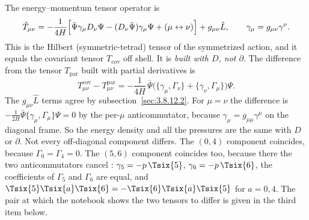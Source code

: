 The energy--momentum tensor operator is
\begin{equation}
  \hat T_{\mu\nu}=-\frac{1}{4H}\Bigl[\bar\Psi\gamma_\mu D_\nu\Psi-(D_\nu\bar\Psi)\gamma_\mu\Psi+(\mu\leftrightarrow\nu)\Bigr]+g_{\mu\nu}\hat L,
  \qquad \gamma_\mu=g_{\mu\nu}\gamma^\nu .
\end{equation}
This is the Hilbert (symmetric-tetrad) tensor of the symmetrized action, and it equals the
covariant tensor $T_{\text{cov}}$ off shell. It is \emph{built with $D$, not $\partial$}. The
difference from the tensor $T_{\text{par}}$ built with partial derivatives is \cfderived
\begin{equation}
  T^{\text{cov}}_{\mu\nu}-T^{\text{par}}_{\mu\nu}=-\frac{1}{4H}\,\bar\Psi\bigl(\{\gamma_\mu,\Gamma_\nu\}+\{\gamma_\nu,\Gamma_\mu\}\bigr)\Psi .
\end{equation}
The $g_{\mu\nu}\hat L$ terms agree by subsection~\ref{sec:3.8.12.2}. For $\mu=\nu$ the difference is
$-\frac{1}{2H}\bar\Psi\{\gamma_\mu,\Gamma_\mu\}\Psi=0$ by the per-$\mu$ anticommutator, because
$\gamma_\mu=g_{\mu\mu}\gamma^\mu$ on the diagonal frame. So the energy density and all the pressures
are the same with $D$ or $\partial$. Not every off-diagonal component differs. The $(0,4)$
component coincides, because $\Gamma_0=\Gamma_4=0$. The $(5,6)$ component coincides too, because
there the two anticommutators cancel \cfderived: $\gamma_5=-p\,\Tsix{5}$, $\gamma_6=-p\,\Tsix{6}$,
the coefficients of $\Gamma_5$ and $\Gamma_6$ are equal, and
$\Tsix{5}\Tsix{a}\Tsix{6}=-\Tsix{6}\Tsix{a}\Tsix{5}$ for $a=0,4$. The pair at which the
notebook shows the two tensors to differ is given in the third item below.
